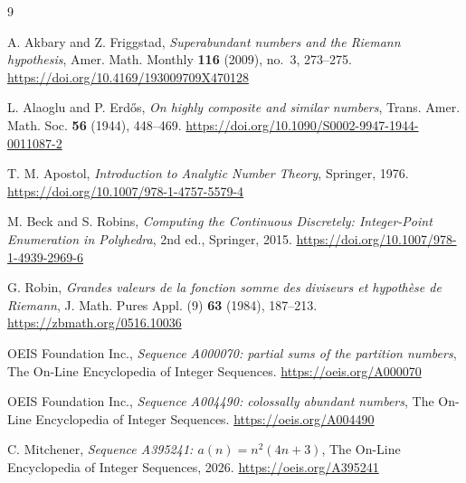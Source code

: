 \documentclass[11pt]{amsart}
\theoremstyle{definition}
\theoremstyle{remark}
\begin{document}
\begin{thebibliography}{9}

A. Akbary and Z. Friggstad, \emph{Superabundant numbers and the Riemann hypothesis}, Amer. Math. Monthly \textbf{116} (2009), no.~3, 273--275. \url{https://doi.org/10.4169/193009709X470128}

L. Alaoglu and P. Erd\H{o}s, \emph{On highly composite and similar numbers}, Trans. Amer. Math. Soc. \textbf{56} (1944), 448--469. \url{https://doi.org/10.1090/S0002-9947-1944-0011087-2}

T. M. Apostol, \emph{Introduction to Analytic Number Theory}, Springer, 1976. \url{https://doi.org/10.1007/978-1-4757-5579-4}

M. Beck and S. Robins, \emph{Computing the Continuous Discretely: Integer-Point Enumeration in Polyhedra}, 2nd ed., Springer, 2015. \url{https://doi.org/10.1007/978-1-4939-2969-6}

G. Robin, \emph{Grandes valeurs de la fonction somme des diviseurs et hypoth\`ese de Riemann}, J. Math. Pures Appl. (9) \textbf{63} (1984), 187--213. \url{https://zbmath.org/0516.10036}

OEIS Foundation Inc., \emph{Sequence A000070: partial sums of the partition numbers}, The On-Line Encyclopedia of Integer Sequences. \href{https://oeis.org/A000070}{https://oeis.org/A000070}

OEIS Foundation Inc., \emph{Sequence A004490: colossally abundant numbers}, The On-Line Encyclopedia of Integer Sequences. \href{https://oeis.org/A004490}{https://oeis.org/A004490}

C. Mitchener, \emph{Sequence A395241: $a(n) = n^{2}(4n+3)$}, The On-Line Encyclopedia of Integer Sequences, 2026. \href{https://oeis.org/A395241}{https://oeis.org/A395241}

\end{thebibliography}
\end{document}
